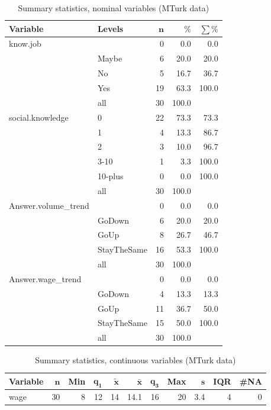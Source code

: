 \documentclass[a4paper,10pt]{article}\usepackage[]{graphicx}\usepackage[]{color}
\begin{document}
\begin{table}[ht]
\centering
{\footnotesize
\begin{tabular}{ll|rrr}
 \textbf{Variable} & \textbf{Levels} & $\mathbf{n}$ & $\mathbf{\%}$ & $\mathbf{\sum \%}$ \\ 
  \hline
know.job &  & 0 & 0.0 & 0.0 \\ 
   & Maybe & 6 & 20.0 & 20.0 \\ 
   & No & 5 & 16.7 & 36.7 \\ 
   & Yes & 19 & 63.3 & 100.0 \\ 
   \hline
 & all & 30 & 100.0 &  \\ 
   \hline
\hline
social.knowledge & 0 & 22 & 73.3 & 73.3 \\ 
   & 1 & 4 & 13.3 & 86.7 \\ 
   & 2 & 3 & 10.0 & 96.7 \\ 
   & 3-10 & 1 & 3.3 & 100.0 \\ 
   & 10-plus & 0 & 0.0 & 100.0 \\ 
   \hline
 & all & 30 & 100.0 &  \\ 
   \hline
\hline
Answer.volume\_trend &  & 0 & 0.0 & 0.0 \\ 
   & GoDown & 6 & 20.0 & 20.0 \\ 
   & GoUp & 8 & 26.7 & 46.7 \\ 
   & StayTheSame & 16 & 53.3 & 100.0 \\ 
   \hline
 & all & 30 & 100.0 &  \\ 
   \hline
\hline
Answer.wage\_trend &  & 0 & 0.0 & 0.0 \\ 
   & GoDown & 4 & 13.3 & 13.3 \\ 
   & GoUp & 11 & 36.7 & 50.0 \\ 
   & StayTheSame & 15 & 50.0 & 100.0 \\ 
   \hline
 & all & 30 & 100.0 &  \\ 
   \hline
\hline
\end{tabular}
}
\caption{Summary statistics, nominal variables (MTurk data)} 
\label{tab1:43-3020}
\end{table}
\begin{table}[ht]
\centering
{\footnotesize
\begin{tabular}{lrrrrrrrrrr}
 \textbf{Variable} & $\mathbf{n}$ & \textbf{Min} & $\mathbf{q_1}$ & $\mathbf{\widetilde{x}}$ & $\mathbf{\bar{x}}$ & $\mathbf{q_3}$ & \textbf{Max} & $\mathbf{s}$ & \textbf{IQR} & \textbf{\#NA} \\ 
  \hline
wage & 30 & 8 & 12 & 14 & 14.1 & 16 & 20 & 3.4 & 4 & 0 \\ 
  \end{tabular}
}
\caption{Summary statistics, continuous variables (MTurk data)} 
\label{tab2:43-3020}
\end{table}
\end{document}
